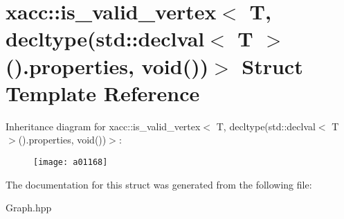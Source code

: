 \hypertarget{a01168}{}\section{xacc\+:\+:is\+\_\+valid\+\_\+vertex$<$ T, decltype(std\+:\+:declval$<$ T $>$().properties, void())$>$ Struct Template Reference}
\label{a01168}
Inheritance diagram for xacc\+:\+:is\+\_\+valid\+\_\+vertex$<$ T, decltype(std\+:\+:declval$<$ T $>$().properties, void())$>$\+:\begin{figure}[H]
\begin{center}
\leavevmode
\texttt{[image: a01168]}
\end{center}
\end{figure}


The documentation for this struct was generated from the following file\+:\begin{DoxyCompactItemize}
\item 
Graph.\+hpp\end{DoxyCompactItemize}
